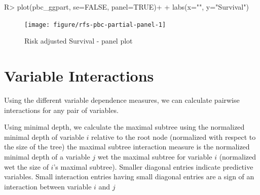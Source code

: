 \documentclass[nojss]{jss}\usepackage[]{graphicx}\usepackage[]{color}
\begin{document}
\begin{Schunk}
\begin{Sinput}
R> plot(pbc_ggpart, se=FALSE, panel=TRUE)+
+   labs(x="", y="Survival")
\end{Sinput}
\begin{figure}[!htpb]

{\centering \texttt{[image: figure/rfs-pbc-partial-panel-1]} 

}

\caption[Risk adjusted Survival - panel plot]{Risk adjusted Survival - panel plot\label{fig:pbc-partial-panel}}
\end{figure}
\end{Schunk}


\section{Variable Interactions}\label{S:interactions}
Using the different variable dependence measures, we can calculate pairwise interactions for any pair of variables. 

Using minimal depth, we calculate the maximal subtree using the normalized minimal depth of variable $i$ relative to the root node (normalized with respect to the size of the tree) the maximal subtree interaction measure  is the normalized minimal depth of a variable $j$ wet the maximal subtree for variable $i$ (normalized wet the size of $i$'s maximal subtree). Smaller diagonal entries indicate predictive variables. Small interaction entries having small diagonal entries are a sign of an interaction between variable $i$ and $j$~\citep{Ishwaran_HighDimension:2010,Ishwaran_HighDimension:2011} 
\end{document}
